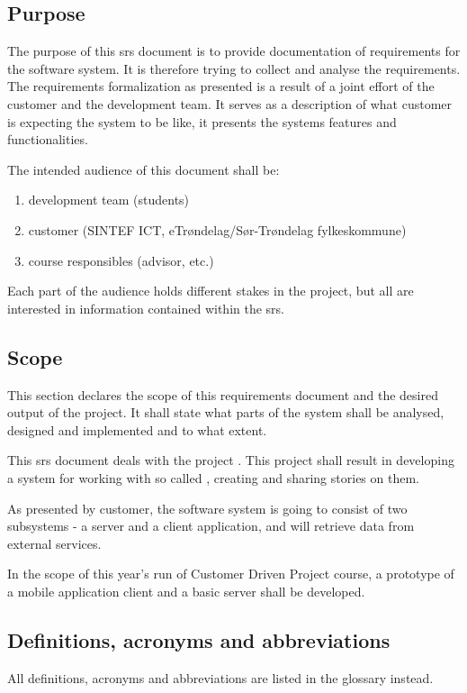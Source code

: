 \documentclass[11pt]{book}
\begin{document}
\subsection{Purpose}
The purpose of this \gls{srs} document is to provide documentation of requirements for the \systemname software system. It is therefore trying to collect and analyse the requirements. The requirements formalization as presented is a result of a joint effort of the customer and the development team. It serves as a description of what customer is expecting the system to be like, it presents the systems features and functionalities.

The intended audience of this document shall be:

\begin{enumerate}
  \item development team (students)
  \item customer (SINTEF ICT, eTrøndelag/Sør-Trøndelag fylkeskommune)
  \item course responsibles (advisor, etc.)
\end{enumerate}

Each part of the audience holds different stakes in the project, but all are interested in information contained within the \gls{srs}.

\subsection{Scope}
This section declares the scope of this requirements document and the desired output of the project. It shall state what parts of the system shall be analysed, designed and implemented and to what extent.

This \gls{srs} document deals with the project \fullprojectname. This project shall result in developing a system for working with so called \wallentityp, creating and sharing stories on them.

As presented by customer, the \systemname software system is going to consist of two subsystems - a server and a client application, and will retrieve data from external services.

In the scope of this year's run of Customer Driven Project course, a prototype of a mobile application client and a basic server shall be developed.

\subsection{Definitions, acronyms and abbreviations}
All definitions, acronyms and abbreviations are listed in the glossary instead.
\end{document}

